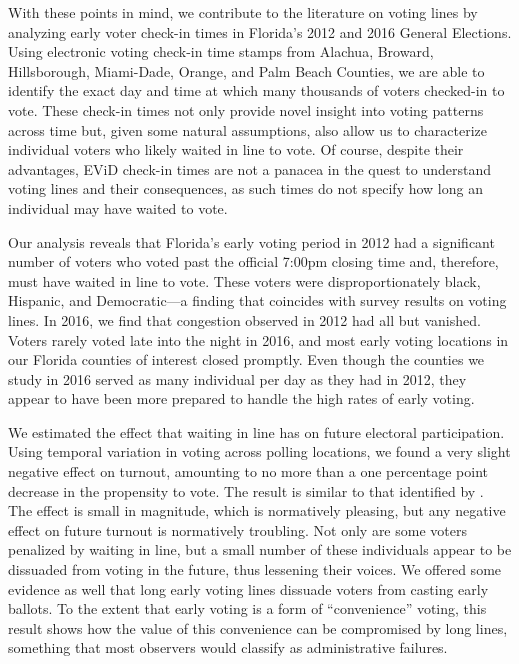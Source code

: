\documentclass[12pt,titlepage]{article}
\begin{document}
With these points in mind, we contribute to the literature on voting
lines by analyzing early voter check-in times in Florida's 2012 and
2016 General Elections. Using electronic voting check-in time stamps
from Alachua, Broward, Hillsborough, Miami-Dade, Orange, and Palm
Beach Counties, we are able to identify the exact day and time at
which many thousands of voters checked-in to vote.  These check-in
times not only provide novel insight into voting patterns across time
but, given some natural assumptions, also allow us to characterize
individual voters who likely waited in line to vote. Of course,
despite their advantages, EViD check-in times are not a panacea in the
quest to understand voting lines and their consequences, as such times
do not specify how long an individual may have waited to vote.  


Our analysis reveals that Florida's early voting period in 2012 had a
significant number of voters who voted past the official 7:00pm
closing time and, therefore, must have waited in line to vote.  These
voters were disproportionately black, Hispanic, and Democratic---a
finding that coincides with survey results on voting lines.  In 2016,
we find that congestion observed in 2012 had all but vanished.  Voters
rarely voted late into the night in 2016, and most early voting
locations in our Florida counties of interest closed promptly.  Even
though the counties we study in 2016 served as many individual per day
as they had in 2012, they appear to have been more prepared to handle
the high rates of early voting.
  
We estimated the effect that waiting in line has on future electoral
participation.  Using temporal variation in voting across polling
locations, we found a very slight negative effect on turnout,
amounting to no more than a one percentage point decrease in the
propensity to vote. The result is similar to that identified by
\citet{pettigrew:racegapwaittimes}.  The effect is small in magnitude,
which is normatively pleasing, but any negative effect on future
turnout is normatively troubling.  Not only are some voters penalized
by waiting in line, but a small number of these individuals appear to
be dissuaded from voting in the future, thus lessening their voices.
We offered some evidence as well that long early voting lines dissuade
voters from casting early ballots.  To the extent that early voting is
a form of ``convenience'' voting, this result shows how the value of
this convenience can be compromised by long lines, something that most
observers would classify as administrative failures.
\end{document}
